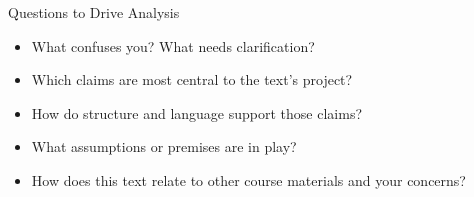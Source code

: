 \documentclass[aspectratio=169]{beamer}
\begin{document}


\begin{frame}{Questions to Drive Analysis}
\begin{itemize}
  \item What confuses you? What needs clarification?
  \item Which claims are most central to the text's project?
  \item How do structure and language support those claims?
  \item What assumptions or premises are in play?
  \item How does this text relate to other course materials and your concerns?
\end{itemize}
\end{frame}
\end{document}
